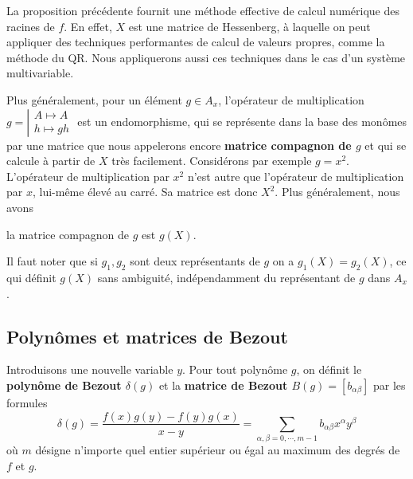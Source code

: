 \documentclass{standalone}
\begin{document}
  \begin{rem}
  La proposition précédente fournit une méthode effective de calcul numérique des racines de $f$. En effet, $X$ est une matrice de Hessenberg, à laquelle on peut appliquer des techniques performantes de calcul de valeurs propres, comme la méthode du QR. Nous appliquerons aussi ces techniques dans le cas d'un système multivariable.
  \end{rem}
  Plus généralement, pour un élément $g\in A_x$, l'opérateur de multiplication
  $g = \left\vert
  \begin{array}{c}
  A \mapsto A \\
  h \mapsto gh
  \end{array}
  \right.$
  est un endomorphisme, qui se représente dans la base des monômes par une matrice que nous appelerons encore {\bf matrice compagnon de $g$} et qui se calcule à partir de $X$ très facilement. Considérons par exemple $g = x^2$. L'opérateur de multiplication par $x^2$ n'est autre que l'opérateur de multiplication par $x$, lui-même élevé au carré. Sa matrice est donc $X^2$. Plus généralement, nous avons
  \begin{prop}
  la matrice compagnon de $g$ est $g(X)$.
  \end{prop}

  \begin{rem}
  Il faut noter que si $g_1, g_2$ sont deux représentants de $g$ on a $g_1(X) = g_2(X)$, ce qui définit $g(X)$ sans ambiguité, indépendamment du représentant de $g$ dans $A_x$.
  \end{rem}

  \subsection{Polynômes et matrices de Bezout}
  \begin{defn}
  \label{def_bez}
  Introduisons une nouvelle variable $y$.
  Pour tout polynôme $g$, on définit le {\bf polynôme de Bezout $\delta(g)$} et la {\bf matrice de Bezout $B(g) = [b_{\alpha\beta}]$}  par les formules
  \begin{equation}
  \delta(g) = \dfrac{f(x)g(y)-f(y)g(x)}{x-y} = \sum_{\alpha,\beta = 0, \cdots, m-1} b_{\alpha\beta} x^\alpha y^\beta
  \end{equation}
  où $m$ désigne n'importe quel entier supérieur ou égal au maximum des degrés de $f$ et $g$.
  \end{defn}
\end{document}
